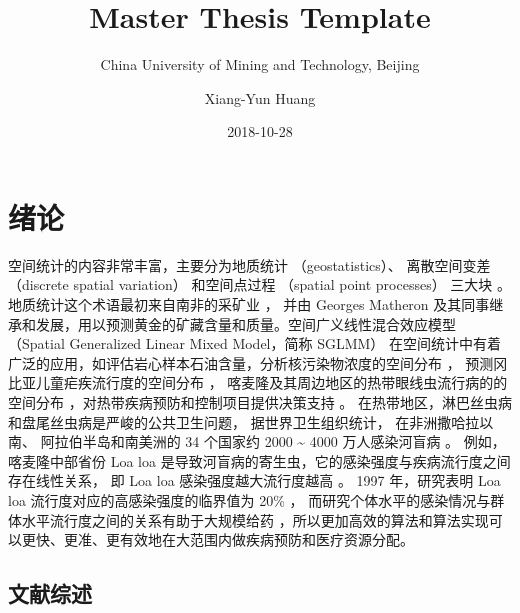 \documentclass[12pt,a4paper,UTF8,twoside]{book}
\title{Master Thesis Template}
\subtitle{China University of Mining and Technology, Beijing}
\author{Xiang-Yun Huang}
\date{2018-10-28}
\theoremstyle{definition}
\theoremstyle{definition}
\theoremstyle{definition}
\theoremstyle{remark}
\begin{document}





{
\setcounter{tocdepth}{2}
\tableofcontents
}

\mainmatter

\hypertarget{intro}{%
\chapter{绪论}\label{intro}}

空间统计的内容非常丰富，主要分为地质统计 （geostatistics）、
离散空间变差 （discrete spatial variation） 和空间点过程 （spatial point
processes） 三大块 \citep{Cressie1993}。
地质统计这个术语最初来自南非的采矿业 \citep{Krige1951}， 并由 Georges
Matheron
及其同事继承和发展，用以预测黄金的矿藏含量和质量。空间广义线性混合效应模型
（Spatial Generalized Linear Mixed Model，简称 SGLMM）
在空间统计中有着广泛的应用，如评估岩心样本石油含量，分析核污染物浓度的空间分布
\citep{Diggle1998}， 预测冈比亚儿童疟疾流行度的空间分布
\citep{Diggle2002Childhood}，
喀麦隆及其周边地区的热带眼线虫流行病的的空间分布
\citep{Diggle2007ATMP}，对热带疾病预防和控制项目提供决策支持
\citep{Schl2016Using}。
在热带地区，淋巴丝虫病和盘尾丝虫病是严峻的公共卫生问题，
据世界卫生组织统计， 在非洲撒哈拉以南、 阿拉伯半岛和南美洲的 34 个国家约
2000 \textasciitilde{} 4000 万人感染河盲病 \citep{Takougang2002Rapid}。
例如， 喀麦隆中部省份 Loa loa
是导致河盲病的寄生虫，它的感染强度与疾病流行度之间存在线性关系， 即 Loa
loa 感染强度越大流行度越高 \citep{Boussinesq2001}。 1997 年，研究表明
Loa loa 流行度对应的高感染强度的临界值为 20\%
\citep{Gardon1997Serious}，
而研究个体水平的感染情况与群体水平流行度之间的关系有助于大规模给药
\citep{Schl2016Using}，所以更加高效的算法和算法实现可以更快、更准、更有效地在大范围内做疾病预防和医疗资源分配。

\hypertarget{reviews}{%
\section{文献综述}\label{reviews}}
\end{document}
